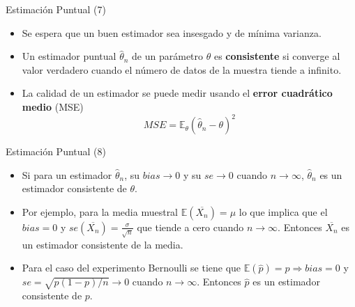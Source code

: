 \documentclass[handout]{beamer}
\begin{document}
\begin{frame}{Estimación Puntual (7)}

\scriptsize{

\begin{itemize}
\item Se espera que un buen estimador sea insesgado y de mínima varianza.
\item Un estimador puntual $\hat{\theta}_n$ de un parámetro $\theta$ es \textbf{consistente} si converge al valor verdadero cuando el número de datos de la muestra tiende a infinito.
\item La calidad de un estimador se puede medir usando el \textbf{error cuadrático medio} (MSE)
\begin{displaymath}
MSE = \mathbb{E}_{\theta}(\hat{\theta}_n - \theta)^2 
\end{displaymath}

\end{itemize}

} 
\end{frame}



\begin{frame}{Estimación Puntual (8)}

\scriptsize{

\begin{itemize}
\item Si para un estimador $\hat{\theta}_n$, su $bias \rightarrow 0$ y su $se \rightarrow 0$ cuando $n\rightarrow \infty$, $\hat{\theta}_n$ es un estimador consistente de $\theta$.

\item Por ejemplo, para la media muestral $\mathbb{E}(\overline{X_{n}})=\mu$ lo que implica que el $bias =0$ y $se(\overline{X_{n}}) = \frac{\sigma}{\sqrt{n}}$ que tiende a cero cuando $n\rightarrow \infty$. Entonces $\overline{X_{n}}$ es un estimador consistente de la media.  

\item Para el caso del experimento Bernoulli se tiene que $\mathbb{E}(\hat{p})=p \Rightarrow bias=0$ y $se = \sqrt{p(1-p)/n} \rightarrow 0$ cuando $n\rightarrow \infty$. Entonces $\hat{p}$ es un estimador consistente de $p$.


\end{itemize}

} 
\end{frame}
\end{document}
